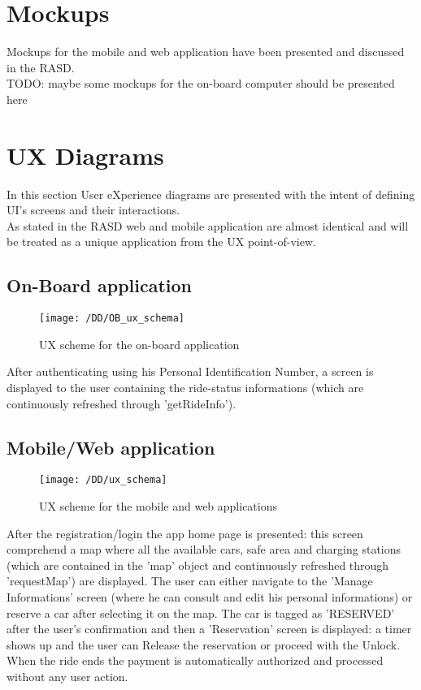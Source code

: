 \section{Mockups}
	Mockups for the mobile and web application have been presented and discussed in the RASD. 
	\\TODO: maybe some mockups for the on-board computer should be presented here

\section{UX Diagrams}
	In this section User eXperience diagrams are presented with the intent of defining UI's screens and their interactions.
	\\As stated in the RASD web and mobile application are almost identical and will be treated as a unique application from the UX point-of-view.

	\subsection{On-Board application}
		\begin{figure}[!ht]
		  \centering
		  \vspace{0.2cm}
		  \texttt{[image: /DD/OB\_ux\_schema]}\\
		  \vspace{0.4cm}
		  \caption{UX scheme for the on-board application} 
		  \label{fig:OB_ux_scheme} 
		\end{figure}

		After authenticating using his Personal Identification Number, a screen is displayed to the user containing the ride-status informations (which are continuously refreshed through 'getRideInfo').


	\subsection{Mobile/Web application}
		\begin{figure}[!ht]
		  \centering
		  \vspace{0.2cm}
		  \texttt{[image: /DD/ux\_schema]}\\
		  \vspace{0.4cm}
		  \caption{UX scheme for the mobile and web applications} 
		  \label{fig:ux_scheme} 
		\end{figure}

		After the registration/login the app home page is presented: this screen comprehend a map where all the available cars, safe area and charging stations (which are contained in the 'map' object and continuously refreshed through 'requestMap') are displayed. The user can either navigate to the 'Manage Informations' screen (where he can consult and edit his personal informations) or reserve a car after selecting it on the map. The car is tagged as 'RESERVED' after the user's confirmation and then a 'Reservation' screen is displayed: a timer shows up and the user can Release the reservation or proceed with the Unlock.
		\\When the ride ends the payment is automatically authorized and processed without any user action.
